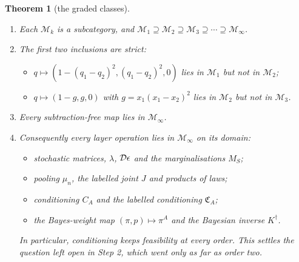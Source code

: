 \documentclass[11pt]{article}
\newtheorem{theorem}{Theorem}\newtheorem{proposition}[theorem]{Proposition}\newtheorem{lemma}[theorem]{Lemma}\newtheorem{corollary}[theorem]{Corollary}\newtheorem{conjecture}[theorem]{Conjecture}
\theoremstyle{definition}\newtheorem{definition}[theorem]{Definition}\newtheorem{remark}[theorem]{Remark}\newtheorem{example}[theorem]{Example}
\begin{document}
\begin{theorem}[the graded classes]\label{thm:graded}
\begin{enumerate}
\item[(1)] Each $\mathcal M_k$ is a subcategory, and $\mathcal M_1\supseteq\mathcal M_2\supseteq\mathcal M_3\supseteq\cdots\supseteq\mathcal M_\infty$.
\item[(2)] The first two inclusions are strict:
  \begin{itemize}
  \item $q\mapsto(1-(q_1-q_2)^2,(q_1-q_2)^2,0)$ lies in $\mathcal M_1$ but not in $\mathcal M_2$;
  \item $q\mapsto(1-g,g,0)$ with $g=x_1(x_1-x_2)^2$ lies in $\mathcal M_2$ but not in $\mathcal M_3$.
  \end{itemize}
\item[(3)] Every subtraction-free map lies in $\mathcal M_\infty$.
\item[(4)] Consequently every layer operation lies in $\mathcal M_\infty$ on its domain:
  \begin{itemize}
  \item stochastic matrices, $\lambda$, $\mathcal D\epsilon$ and the marginalisations $M_S$;
  \item pooling $\mu_n$, the labelled joint $J$ and products of laws;
  \item conditioning $C_A$ and the labelled conditioning $\mathfrak C_A$;
  \item the Bayes-weight map $(\pi,p)\mapsto\pi^A$ and the Bayesian inverse $K^\dagger$.
  \end{itemize}
  In particular, conditioning keeps feasibility at every order. This settles the question left open in Step 2, which went only as far as order two.
\end{enumerate}
\end{theorem}
\end{document}
